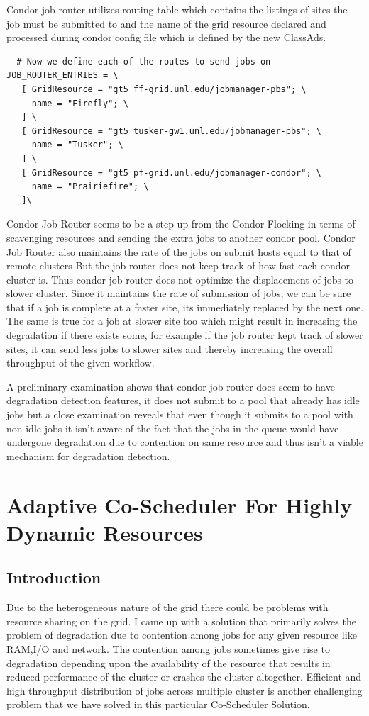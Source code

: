 \documentclass[ms,electronic,double]{nuthesis}
\begin{document}
Condor job router utilizes routing table which contains the listings of sites 
the job must be submitted to and the name of the grid resource declared and 
processed during condor config file which is defined by the new ClassAds.

\begin{lstlisting}
  # Now we define each of the routes to send jobs on
JOB_ROUTER_ENTRIES = \
   [ GridResource = "gt5 ff-grid.unl.edu/jobmanager-pbs"; \
     name = "Firefly"; \
   ] \
   [ GridResource = "gt5 tusker-gw1.unl.edu/jobmanager-pbs"; \
     name = "Tusker"; \
   ] \
   [ GridResource = "gt5 pf-grid.unl.edu/jobmanager-condor"; \
     name = "Prairiefire"; \
   ]\

\end{lstlisting}


Condor Job Router seems to be a step up from the Condor Flocking in terms of 
scavenging resources and sending the extra jobs to another condor pool. Condor 
Job Router also maintains the rate of the jobs on submit hosts equal to that of remote clusters But the job 
router does not keep track of how fast each condor cluster is. Thus 
condor job router does not optimize the displacement of jobs to slower 
cluster. Since it maintains the rate of submission of jobs, we can be sure that if a job is complete 
at a faster site, its immediately replaced by the next one. The same is true for a job at slower site too
which might result in increasing the degradation if there exists some, for example if the job router kept track of slower sites, it
can send less jobs to slower sites and thereby increasing the overall throughput of the given workflow.

A preliminary examination shows that condor job router does seem to have degradation detection features, 
it does not submit to a pool that already has idle jobs but a close examination reveals that even though it
submits to a pool with non-idle jobs it isn't aware of the fact that the jobs in the queue would have 
undergone degradation due to contention on same resource and thus isn't a viable mechanism for degradation detection.

\chapter{Adaptive Co-Scheduler For Highly Dynamic Resources}

\section{Introduction}
Due to the heterogeneous nature of the grid there could be problems with resource sharing on the grid. I 
came up with a solution that primarily solves the problem of degradation due to contention among 
jobs for any given resource like RAM,I/O and network. The contention among jobs sometimes give rise to 
degradation depending upon the availability of the resource that results in reduced performance of the cluster or crashes the cluster
altogether. Efficient and high throughput
distribution of jobs across multiple cluster is another challenging problem that we have solved in 
this particular Co-Scheduler Solution. 
\end{document}
